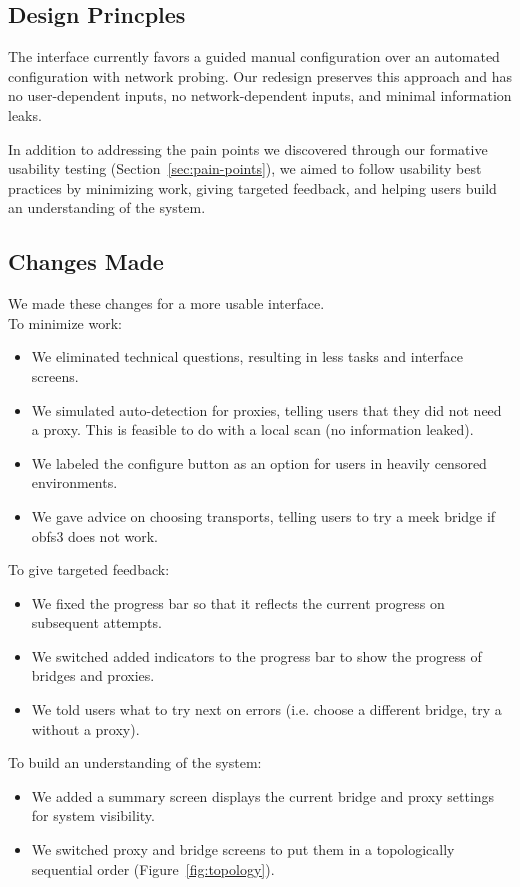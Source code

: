 \documentclass[USenglish,oneside,twocolumn]{article}
\begin{document}
\subsection{Design Princples} 
The interface currently favors a guided manual configuration over an automated configuration with network probing. Our redesign preserves this approach and has no user-dependent inputs, no network-dependent inputs, and minimal information leaks.

In addition to addressing the pain points we discovered through our formative usability testing (Section~\ref{sec:pain-points}), we aimed to follow usability best practices by minimizing work, giving targeted feedback, and helping users build an understanding of the system.

\subsection{Changes Made} 
We made these changes for a more usable interface. \\

\noindent To minimize work: 
\begin{itemize}
\item We eliminated technical questions, resulting in less tasks and interface screens. 
\item We simulated auto-detection for proxies, telling users that they did not need a proxy. This is feasible to do with a local scan (no information leaked). 
\item We labeled the configure button as an option for users in heavily censored environments.
\item We gave advice on choosing transports, telling users to try a meek bridge if obfs3 does not work.
\end{itemize} 

To give targeted feedback: 
\begin{itemize}
\item We fixed the progress bar so that it reflects the current progress on subsequent attempts. 
\item We switched added indicators to the progress bar to show the progress of bridges and proxies. 
\item We told users what to try next on errors (i.e. choose a different bridge, try a without a proxy). 
\end{itemize}

To build an understanding of the system:
\begin{itemize}
\item We added a summary screen displays the current bridge and proxy settings for system visibility. 
\item We switched proxy and bridge screens to put them in a topologically sequential order (Figure~\ref{fig:topology}).
\end{itemize}
\end{document}
